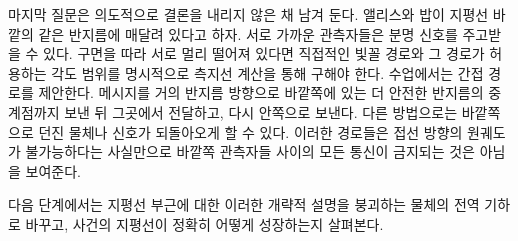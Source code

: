 마지막 질문은 의도적으로 결론을 내리지 않은 채 남겨 둔다. 앨리스와 밥이 지평선 바깥의 같은 반지름에 매달려 있다고 하자. 서로 가까운 관측자들은 분명 신호를 주고받을 수 있다. 구면을 따라 서로 멀리 떨어져 있다면 직접적인 빛꼴 경로와 그 경로가 허용하는 각도 범위를 명시적으로 측지선 계산을 통해 구해야 한다. 수업에서는 간접 경로를 제안한다. 메시지를 거의 반지름 방향으로 바깥쪽에 있는 더 안전한 반지름의 중계점까지 보낸 뒤 그곳에서 전달하고, 다시 안쪽으로 보낸다. 다른 방법으로는 바깥쪽으로 던진 물체나 신호가 되돌아오게 할 수 있다. 이러한 경로들은 접선 방향의 원궤도가 불가능하다는 사실만으로 바깥쪽 관측자들 사이의 모든 통신이 금지되는 것은 아님을 보여준다.

\begin{classroomqa}
\end{classroomqa}

다음 단계에서는 지평선 부근에 대한 이러한 개략적 설명을 붕괴하는 물체의 전역 기하로 바꾸고, 사건의 지평선이 정확히 어떻게 성장하는지 살펴본다.